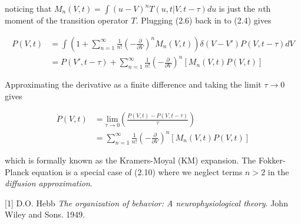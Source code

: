 \documentclass{ucetd}
\begin{document}
\begin{appendices}
noticing that $M_{n}(V,t) = \int(u-V)^{n}T(u, t | V, t-\tau)du$ is just the $n$th moment of the transition operator $T$. Plugging (2.6) back in to (2.4) gives 

\begin{align}
P(V, t) &= \int \left(1 + \sum_{n=1}^{\infty} \frac{1}{n!}\left(-\frac{\partial}{\partial V}\right)^{n} M_{n}(V,t)\right)\delta(V-V')P(V, t-\tau)dV\\
&= P(V', t-\tau) + \sum_{n=1}^{\infty} \frac{1}{n!}\left(-\frac{\partial}{\partial V}\right)^{n} \left[M_{n}(V,t)P(V,t)\right]
\end{align} 

Approximating the derivative as a finite difference and taking the limit $\tau\rightarrow 0$ gives

\begin{align}
\dot{P}(V,t)  &= \underset{\tau\rightarrow 0}{\mathrm{lim}}\left(\frac{P(V, t)-P(V, t-\tau)}{\tau}\right)\\
&= \sum_{n=1}^{\infty} \frac{1}{n!}\left(-\frac{\partial}{\partial V}\right)^{n} \left[M_{n}(V,t)P(V,t)\right]
\end{align} 

which is formally known as the Kramers-Moyal (KM) expansion. The Fokker-Planck equation is a special case of (2.10) where we neglect terms $n>2$ in the \emph{diffusion approximation}.
\end{appendices}

\makebibliography

[1] D.O. Hebb \textit{The organization of behavior: A neurophysiological theory}. John Wiley and Sons. 1949.

%
%
\end{document}

